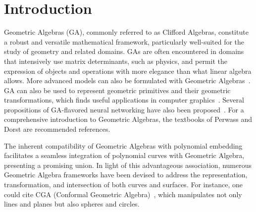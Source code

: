 \documentclass{birkjour}
\begin{document}
\maketitle



\section{Introduction} \label{sec:intro} Geometric Algebras (GA), commonly referred to as Clifford Algebras, constitute a robust and versatile mathematical framework, particularly well-suited for the study of geometry and related domains. GAs are often encountered in domains that intensively use matrix determinants, such as physics, and permit the expression of objects and operations with more elegance than what linear algebra allows. More advanced models can also be formulated with Geometric Algebras~\cite{gregory_elastic_2017,hestenes_zitterbewegung_1990,hestenes_new_2012}. GA can also be used to represent geometric primitives and their geometric transformations, which finds useful applications in computer graphics~\cite{de_keninck_non-parametric_2019}. Several propositions of GA-flavored neural networking have also been proposed~\cite{buchholz_optimal_2007,ruhe_geometric_2023}. For a comprehensive introduction to Geometric Algebras, the textbooks of Perwass and Dorst \cite{perwass_geometric_2009,dorst_geometric_2010} are recommended references. 

The inherent compatibility of Geometric Algebras with polynomial embedding~\cite{perwass_geometric_2009} facilitates a seamless integration of polynomial curves with Geometric Algebra, presenting a promising union. In light of this advantageous association, numerous Geometric Algebra frameworks have been devised to address the representation, transformation, and intersection of both curves and surfaces. For instance, one could cite CGA (Conformal Geometric Algebra)~\cite{dorst_geometric_2010}, which manipulates not only lines and planes but also spheres and circles.
\end{document}
